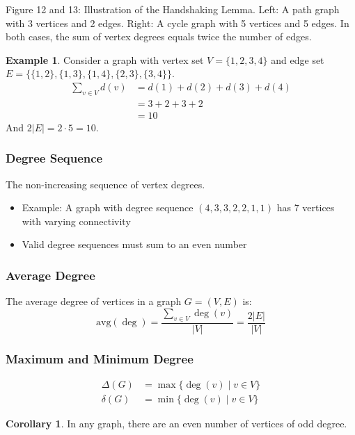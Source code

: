 \documentclass{article}
\theoremstyle{definition}
\newtheorem{example}{Example}
\newtheorem{corollary}{Corollary}
\begin{document}
\vspace{0.3cm}
{\centering
\footnotesize Figure 12 and 13: Illustration of the Handshaking Lemma. Left: A path graph with 3 vertices and 2 edges. Right: A cycle graph with 5 vertices and 5 edges. In both cases, the sum of vertex degrees equals twice the number of edges.
\par}
\begin{example}
Consider a graph with vertex set $V = \{1, 2, 3, 4\}$ and edge set $E = \{\{1,2\}, \{1,3\}, \{1,4\}, \{2,3\}, \{3,4\}\}$.
\begin{align*}
\sum_{v \in V} d(v) &= d(1) + d(2) + d(3) + d(4)\\
&= 3 + 2 + 3 + 2\\
&= 10
\end{align*}
And $2|E| = 2 \cdot 5 = 10$.
\end{example}

\subsubsection{Degree Sequence}
The non-increasing sequence of vertex degrees.
\begin{itemize}
    \item Example: A graph with degree sequence $(4,3,3,2,2,1,1)$ has 7 vertices with varying connectivity
    \item Valid degree sequences must sum to an even number
\end{itemize}
\subsubsection{Average Degree}
The average degree of vertices in a graph $G = (V,E)$ is:
\begin{equation}
\text{avg}(\deg) = \frac{\sum_{v \in V} \deg(v)}{|V|} = \frac{2|E|}{|V|}
\end{equation}
\subsubsection{Maximum and Minimum Degree}
\begin{align}
\Delta(G) &= \max\{\deg(v) \mid v \in V\} \\
\delta(G) &= \min\{\deg(v) \mid v \in V\}
\end{align}
\begin{corollary}
In any graph, there are an even number of vertices of odd degree.
\end{corollary}
\end{document}
